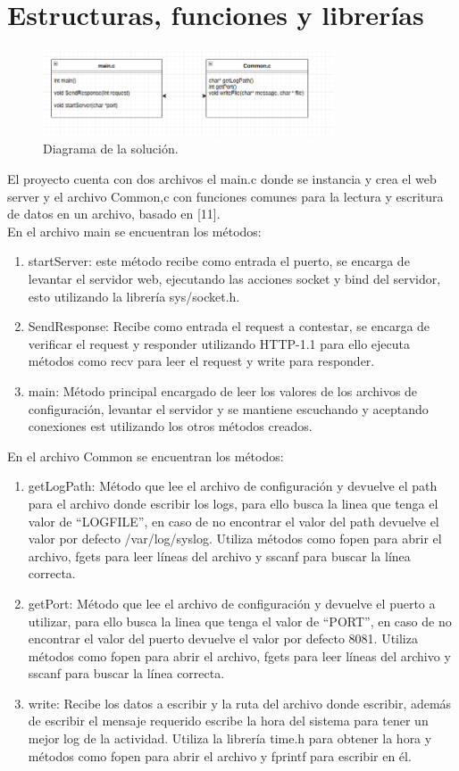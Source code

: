 \documentclass[conference]{IEEEtran}
\begin{document}
\newpage
\section{Estructuras, funciones y librerías}
\begin{figure}[ht!] 
\centering
\includegraphics[width=3.4in]{diagrama.png}
\caption{Diagrama de la solución.}
\end{figure}
El proyecto cuenta con dos archivos el main.c donde se instancia y crea el web server y el archivo Common,c con funciones comunes para la lectura y escritura de datos en un archivo, basado en [11].
\\En el archivo main se encuentran los métodos:
\begin{enumerate}
    \item startServer: este método recibe como entrada el puerto, se encarga de levantar el servidor web, ejecutando las acciones socket y bind del servidor, esto utilizando la librería sys/socket.h.
    \item SendResponse: Recibe como entrada el request a contestar, se encarga de verificar el request y responder utilizando HTTP-1.1 para ello ejecuta métodos como recv para leer el request y write para responder.
    \item main: Método principal encargado de leer los valores de los archivos de configuración, levantar el servidor y se mantiene escuchando y aceptando conexiones est utilizando los otros métodos creados.
\end{enumerate}
En el archivo Common se encuentran los métodos: 
\begin{enumerate}
    \item getLogPath: Método que lee el archivo de configuración y devuelve el path para el archivo donde escribir los logs, para ello busca la linea que tenga el valor de “LOGFILE”, en caso de no encontrar el valor del path devuelve el valor por defecto /var/log/syslog. Utiliza métodos como fopen para abrir el archivo, fgets para leer líneas del archivo y sscanf para buscar la línea correcta.
    \item getPort: Método que lee el archivo de configuración y devuelve el puerto a utilizar, para ello busca la linea que tenga el valor de “PORT”, en caso de no encontrar el valor del puerto devuelve el valor por defecto 8081. Utiliza métodos como fopen para abrir el archivo, fgets para leer líneas del archivo y sscanf para buscar la línea correcta. 
    \item write: Recibe los datos a escribir y la ruta del archivo donde escribir, además de escribir el mensaje requerido escribe la hora del sistema para tener un mejor log de la actividad. Utiliza la librería time.h para obtener la hora y métodos como fopen para abrir el archivo y fprintf para escribir en él. 
\end{enumerate}
\end{document}
